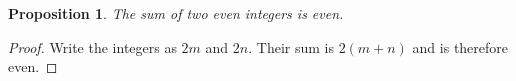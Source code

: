 \documentclass{article}
\newtheorem{proposition}{Proposition}
\begin{document}
\begin{proposition}
The sum of two even integers is even.
\end{proposition}
\begin{proof}
Write the integers as $2m$ and $2n$. Their sum is $2(m+n)$ and is therefore
even.
\end{proof}
\end{document}
